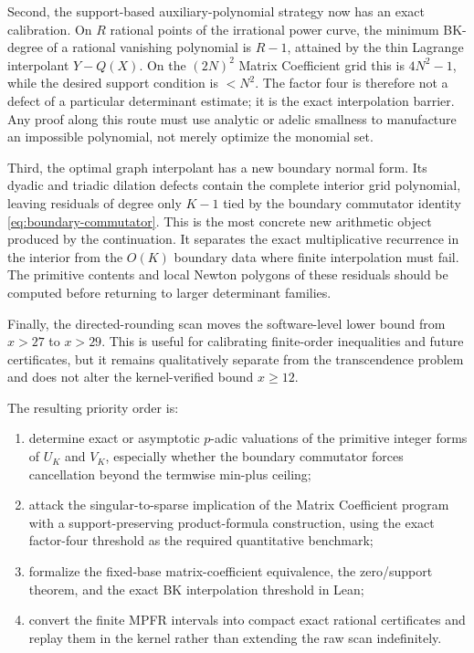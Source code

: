 \documentclass[11pt,oneside]{article}
\theoremstyle{definition}
\theoremstyle{remark}
\begin{document}
Second, the support-based auxiliary-polynomial strategy now has an exact calibration.  On
$R$ rational points of the irrational power curve, the minimum BK-degree of a rational
vanishing polynomial is $R-1$, attained by the thin Lagrange interpolant $Y-Q(X)$.  On the
$(2N)^2$ Matrix Coefficient grid this is $4N^2-1$, while the desired support condition is
$<N^2$.  The factor four is therefore not a defect of a particular determinant estimate; it
is the exact interpolation barrier.  Any proof along this route must use analytic or adelic
smallness to manufacture an impossible polynomial, not merely optimize the monomial set.

Third, the optimal graph interpolant has a new boundary normal form.  Its dyadic and triadic
dilation defects contain the complete interior grid polynomial, leaving residuals of degree
only $K-1$ tied by the boundary commutator identity
\eqref{eq:boundary-commutator}.  This is the most concrete new arithmetic object produced by
the continuation.  It separates the exact multiplicative recurrence in the interior from the
$O(K)$ boundary data where finite interpolation must fail.  The primitive contents and local
Newton polygons of these residuals should be computed before returning to larger determinant
families.

Finally, the directed-rounding scan moves the software-level lower bound from $x>27$ to
$x>29$.  This is useful for calibrating finite-order inequalities and future certificates, but
it remains qualitatively separate from the transcendence problem and does not alter the
kernel-verified bound $x\ge12$.

The resulting priority order is:
\begin{enumerate}
\item determine exact or asymptotic $p$-adic valuations of the primitive integer forms of
$U_K$ and $V_K$, especially whether the boundary commutator forces cancellation beyond the
termwise min-plus ceiling;
\item attack the singular-to-sparse implication of the Matrix Coefficient program with a
support-preserving product-formula construction, using the exact factor-four threshold as the
required quantitative benchmark;
\item formalize the fixed-base matrix-coefficient equivalence, the zero/support theorem, and
the exact BK interpolation threshold in Lean;
\item convert the finite MPFR intervals into compact exact rational certificates and replay
them in the kernel rather than extending the raw scan indefinitely.
\end{enumerate}
\end{document}
